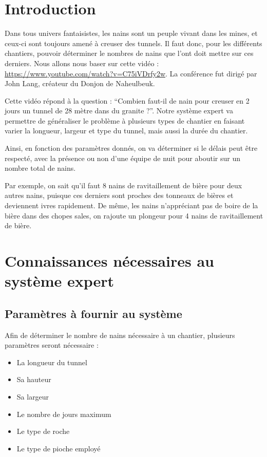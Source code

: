 \documentclass[a4paper,10pt]{report}
\begin{document}
\chapter*{Introduction}

Dans tous univers fantaisistes, les nains sont un peuple vivant dans les mines, et ceux-ci sont toujours amené à creuser des tunnels. Il faut donc, pour les différents chantiers, pouvoir déterminer le nombres de nains que l’ont doit mettre sur ces derniers. Nous allons nous baser sur cette vidéo : 
\newline \url{https://www.youtube.com/watch?v=C75iVDrfy2w}. 
La conférence fut dirigé par John Lang, créateur du Donjon de Naheulbeuk.

Cette vidéo répond à la question : “Combien faut-il de nain pour creuser en 2 jours un tunnel de 28 mètre dans du granite ?”. Notre système expert va permettre de généraliser le problème à plusieurs types de chantier en faisant varier la longueur, largeur et type du tunnel, mais aussi la durée du chantier. 

Ainsi, en fonction des paramètres donnés, on va déterminer si le délais peut être respecté, avec la présence ou non d’une équipe de nuit pour aboutir sur un nombre total de nains. 

Par exemple, on sait qu’il faut 8 nains de ravitaillement de bière pour deux autres nains, puisque ces derniers sont proches des tonneaux de bières et deviennent ivres rapidement. De même, les nains n’appréciant pas de boire de la bière dans des chopes sales, on rajoute un plongeur pour 4 nains de ravitaillement de bière. 


\chapter{Connaissances nécessaires au système expert}
 \section{Paramètres à fournir au système}
 Afin de déterminer le nombre de nains nécessaire à un chantier, plusieurs paramètres seront nécessaire :
\begin{itemize}
\item La longueur du tunnel
\item Sa hauteur
\item Sa largeur
\item Le nombre de jours maximum
\item Le type de roche
\item Le type de pioche employé
\end{itemize}
\end{document}

